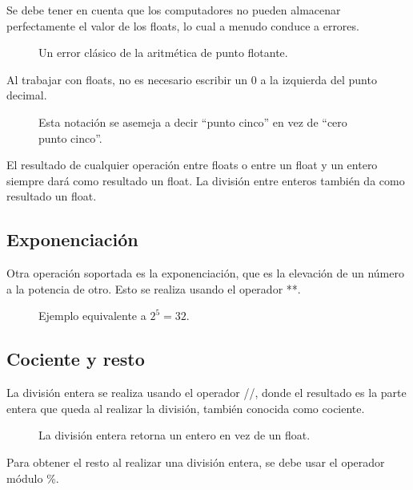 \documentclass{article}
\newcommand{\doble}[1]{``#1''}
\begin{document}
Se debe tener en cuenta que los computadores no pueden almacenar perfectamente el valor de los floats, lo cual a menudo conduce a errores.

\begin{figure*}[ht!]
  \caption{Un error clásico de la aritmética de punto flotante.}
\end{figure*}

Al trabajar con floats, no es necesario escribir un 0 a la izquierda del punto decimal.

\begin{figure*}[ht!]
  \caption{Esta notación se asemeja a decir \doble{punto cinco} en vez de \doble{cero punto cinco}.}
\end{figure*}

El resultado de cualquier operación entre floats o entre un float y un entero siempre dará como resultado un float. La división entre enteros también da como resultado un float.


\subsection{Exponenciación}

Otra operación soportada es la exponenciación, que es la elevación de un número a la potencia de otro. Esto se realiza usando el operador **.

\begin{figure*}[ht!]
  \caption{Ejemplo equivalente a $2 ^ 5 = 32$.}
\end{figure*}

\subsection{Cociente y resto}

La división entera se realiza usando el operador //, donde el resultado es la parte entera que queda al realizar la división, también conocida como cociente.
  
\begin{figure*}[ht!]
  \caption{La división entera retorna un entero en vez de un float.}
\end{figure*}

Para obtener el resto al realizar una división entera, se debe usar el operador módulo \%.
\end{document}

